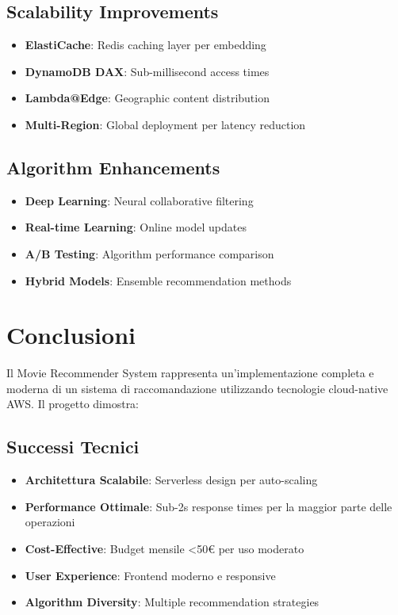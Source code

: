 \documentclass[11pt,a4paper]{article}
\begin{document}
\subsection{Scalability Improvements}
\begin{itemize}
  \item \textbf{ElastiCache}: Redis caching layer per embedding
  \item \textbf{DynamoDB DAX}: Sub-millisecond access times
  \item \textbf{Lambda@Edge}: Geographic content distribution
  \item \textbf{Multi-Region}: Global deployment per latency reduction
\end{itemize}

\subsection{Algorithm Enhancements}
\begin{itemize}
  \item \textbf{Deep Learning}: Neural collaborative filtering
  \item \textbf{Real-time Learning}: Online model updates
  \item \textbf{A/B Testing}: Algorithm performance comparison
  \item \textbf{Hybrid Models}: Ensemble recommendation methods
\end{itemize}

\section{Conclusioni}

Il Movie Recommender System rappresenta un'implementazione completa e moderna di un sistema di raccomandazione utilizzando tecnologie cloud-native AWS. Il progetto dimostra:

\subsection{Successi Tecnici}
\begin{itemize}
  \item \textbf{Architettura Scalabile}: Serverless design per auto-scaling
  \item \textbf{Performance Ottimale}: Sub-2s response times per la maggior parte delle operazioni
  \item \textbf{Cost-Effective}: Budget mensile <50€ per uso moderato
  \item \textbf{User Experience}: Frontend moderno e responsive
  \item \textbf{Algorithm Diversity}: Multiple recommendation strategies
\end{itemize}
\end{document}
